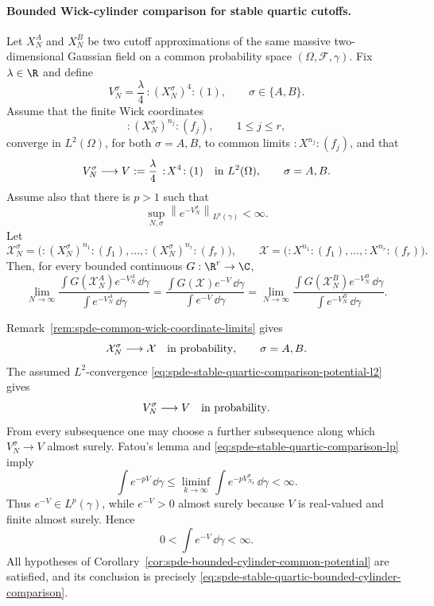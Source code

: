 \paragraph{Bounded Wick-cylinder comparison for stable quartic cutoffs.}
Let \(X_N^A\) and \(X_N^B\) be two cutoff approximations of the same massive
two-dimensional Gaussian field on a common probability space
\((\Omega,\mathcal F,\gamma)\).  Fix \(\lambda\in\R\) and define
\[
  V_N^\sigma
  =
  \frac{\lambda}{4}\,:\!(X_N^\sigma)^4\!:(1),
  \qquad \sigma\in\{A,B\}.
\]
Assume that the finite Wick coordinates
\[
  :\!(X_N^\sigma)^{n_j}\!:(f_j),
  \qquad 1\leq j\leq r,
\]
converge in \(L^2(\Omega)\), for both \(\sigma=A,B\), to common limits
\(:\!X^{n_j}\!:(f_j)\), and that
\begin{equation}
  V_N^\sigma
  \longrightarrow
  V:=\frac{\lambda}{4}\,:\!X^4\!:(1)
  \quad\hbox{in }L^2(\Omega),
  \qquad \sigma=A,B.
  \label{eq:spde-stable-quartic-comparison-potential-l2}
\end{equation}
Assume also that there is \(p>1\) such that
\begin{equation}
  \sup_{N,\sigma}
  \left\|e^{-V_N^\sigma}\right\|_{L^p(\gamma)}
  <\infty .
  \label{eq:spde-stable-quartic-comparison-lp}
\end{equation}
Let
\[
  \mathcal X_N^\sigma
  =
  \bigl(:\!(X_N^\sigma)^{n_1}\!:(f_1),\ldots,
        :\!(X_N^\sigma)^{n_r}\!:(f_r)\bigr),
  \qquad
  \mathcal X
  =
  \bigl(:\!X^{n_1}\!:(f_1),\ldots,:\!X^{n_r}\!:(f_r)\bigr).
\]
Then, for every bounded continuous \(G:\R^r\to\C\),
\begin{equation}
  \lim_{N\to\infty}
  \frac{\int G(\mathcal X_N^A)e^{-V_N^A}\,\dd\gamma}
       {\int e^{-V_N^A}\,\dd\gamma}
  =
  \frac{\int G(\mathcal X)e^{-V}\,\dd\gamma}
       {\int e^{-V}\,\dd\gamma}
  =
  \lim_{N\to\infty}
  \frac{\int G(\mathcal X_N^B)e^{-V_N^B}\,\dd\gamma}
       {\int e^{-V_N^B}\,\dd\gamma}.
  \label{eq:spde-stable-quartic-bounded-cylinder-comparison}
\end{equation}

Remark~\ref{rem:spde-common-wick-coordinate-limits} gives
\[
  \mathcal X_N^\sigma\longrightarrow \mathcal X
  \quad\hbox{in probability},
  \qquad \sigma=A,B.
\]
The assumed \(L^2\)-convergence
\eqref{eq:spde-stable-quartic-comparison-potential-l2} gives
\[
  V_N^\sigma\longrightarrow V
  \quad\hbox{in probability}.
\]
From every subsequence one may choose a further subsequence along which
\(V_N^\sigma\to V\) almost surely.  Fatou's lemma and
\eqref{eq:spde-stable-quartic-comparison-lp} imply
\[
  \int e^{-pV}\,\dd\gamma
  \leq
  \liminf_{k\to\infty}
  \int e^{-pV_{N_k}^\sigma}\,\dd\gamma
  <\infty .
\]
Thus \(e^{-V}\in L^p(\gamma)\), while \(e^{-V}>0\) almost surely because
\(V\) is real-valued and finite almost surely.  Hence
\[
  0<\int e^{-V}\,\dd\gamma<\infty .
\]
All hypotheses of
Corollary~\ref{cor:spde-bounded-cylinder-common-potential} are satisfied,
and its conclusion is precisely
\eqref{eq:spde-stable-quartic-bounded-cylinder-comparison}.

